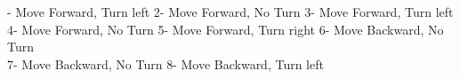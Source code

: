 \documentclass{article}
\begin{document}
	- Move Forward, Turn left   \hspace{20pt}    2- Move Forward, No Turn \hspace{20pt}    3- Move Forward, Turn left \\ 
	4- Move Forward, No Turn  \hspace{20pt}    5- Move Forward, Turn right \hspace{20pt}    6- Move Backward, No Turn \\
	7- Move Backward, No Turn   \hspace{20pt}    8- Move Backward, Turn left
	
	\vspace{50pt}  
	\begin{figure}[h!]
\centering
\begin{minipage}{0.5\textwidth}%

\end{minipage}
\end{figure}
\end{document}
